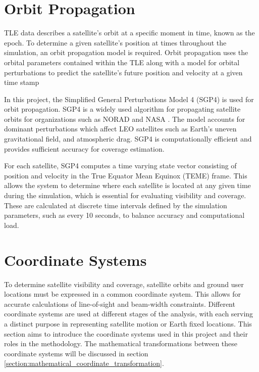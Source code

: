 \FloatBarrier

\section{Orbit Propagation}
TLE data describes a satellite's orbit at a specific moment in time, known as the epoch. To determine a given satellite's position at times throughout the simulation, an orbit propagation model is required. Orbit propagation uses the orbital parameters contained within the TLE along with a model for orbital perturbations to predict the satellite's future position and velocity at a given time stamp
 
In this project, the Simplified General Perturbations Model 4 (SGP4) \cite{vtSpacetrk} is used for orbit propagation. SGP4 is a widely used algorithm for propagating satellite orbits for organizations such as NORAD and NASA \cite{patt1994sgp4}. The model accounts for dominant perturbations which affect LEO satellites such as Earth's uneven gravitational field, and atmospheric drag. SGP4 is computationally efficient and provides sufficient accuracy for coverage estimation.

For each satellite, SGP4 computes a time varying state vector consisting of position and velocity in the True Equator Mean Equinox (TEME) frame. This allows the system to determine where each satellite is located at any given time during the simulation, which is essential for evaluating visibility and coverage. These are calculated at discrete time intervals defined by the simulation parameters, such as every 10 seconds, to balance accuracy and computational load.


\section{Coordinate Systems} \label{section:coordinateTransformations}
To determine satellite visibility and coverage, satellite orbits and ground user locations must be expressed in a common coordinate system. This allows for accurate calculations of line-of-sight and beam-width constraints. Different coordinate systems are used at different stages of the analysis, with each serving a distinct purpose in representing satellite motion or Earth fixed locations. This section aims to introduce the coordinate systems used in this project and their roles in the methodology. The mathematical transformations between these coordinate systems will be discussed in section \ref{section:mathematical_coordinate_transformation}.

